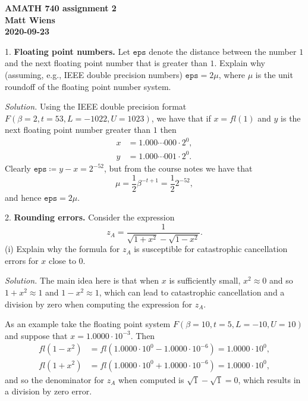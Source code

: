 \documentclass{article}
\begin{document}
\textbf{AMATH 740 assignment 2} \\
\textbf{Matt Wiens} \\
\textbf{2020-09-23}

1. \textbf{Floating point numbers.}
Let $\texttt{eps}$ denote the distance between the number $1$ and
the next floating point number that is greater than $1$. Explain why
(assuming, e.g., IEEE double precision numbers) $\texttt{eps} = 2 \mu$,
where $\mu$ is the unit roundoff of the floating point number system.

\textit{Solution.}
Using the IEEE double precision format
$F(\beta=2,t=53,L=-1022,U=1023)$, we have that if $x = fl(1)$ and
$y$ is the next floating point number greater than $1$ then
%
\begin{align*}
    x &= 1.000 \cdots 000 \cdot 2^0, \\
    y &= 1.000 \cdots 001 \cdot 2^0.
\end{align*}
%
Clearly $\texttt{eps} \coloneqq y - x = 2^{-52}$, but from the course
notes we have that
%
\begin{equation*}
    \mu = \frac{1}{2} \beta^{-t + 1} = \frac{1}{2} 2^{-52}
    ,
\end{equation*}
%
and hence $\texttt{eps} = 2 \mu$.

\newpage

2. \textbf{Rounding errors.}
Consider the expression
%
\begin{equation*}
    z_A = \frac{1}{\sqrt{1 + x^2} - \sqrt{1 - x^2}}.
\end{equation*}
%
(i) Explain why the formula for $z_A$ is susceptible for catastrophic
cancellation errors for $x$ close to $0$.

\textit{Solution.}
The main idea here is that when $x$ is sufficiently small, $x^2 \approx 0$
and so $1 + x^2 \approx 1$ and $1 - x^2 \approx 1$, which can lead to
catastrophic cancellation and a division by zero when computing the expression for $z_A$.

As an example take the floating point system $F(\beta=10,t=5,L=-10,U=10)$
and suppose that $x = 1.0000 \cdot 10^{-3}$. Then
%
\begin{align*}
    fl(1 - x^2) &= fl(1.0000 \cdot 10^0 - 1.0000 \cdot 10^{-6}) = 1.0000 \cdot 10^0, \\
    fl(1 + x^2) &= fl(1.0000 \cdot 10^0 + 1.0000 \cdot 10^{-6}) = 1.0000 \cdot 10^0,
\end{align*}
%
and so the denominator for $z_A$ when computed is $\sqrt{1} - \sqrt{1} = 0$,
which results in a division by zero error.
\end{document}
